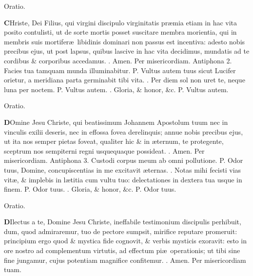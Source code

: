 \documentclass[letter,11pt]{book}
\makeatletter
\DeclareRobustCommand{\Vbar}{\vers@resp{-0.1em}{V}}
\DeclareRobustCommand{\Rbar}{\vers@resp{0pt}{R}}
\newcommand{\vers@resp@sym}{\raisebox{0.2ex}{\rotatebox[origin=c]{-20}{$\m@th\rceil$}}}
\newcommand{\vers@resp}[2]{%
  {\ooalign{\hidewidth\kern#1\vers@resp@sym\hidewidth\cr#2\cr}}%
}%
\def\P{\color{Red} P. \color{black}}
\def\V{\color{Red} \Vbar . \color{black}}
\def\R{\color{Red} \Rbar . \color{black}}
\makeatother
\begin{document}
\begin{multicols*}{2}
\vspace{-.5em} \begin{center} \color{Red} Oratio. \color{black} \end{center} \vspace{-.5em}
\lettrine[lines=2]{\bfseries \color{Red} C}{}Hriste, Dei Filius, qui virgini discipulo virginitatis pr\ae mia etiam in hac vita posito contulisti, ut de sorte mortis posset suscitare membra morientia, qui in membris suis mortifer\ae \ libidinis dominari non passus est incentiva: adesto nobis precibus ejus, ut post lapsus, quibus lascive in hac vita decidimus, mundatis ad te cordibus \& corporibus accedamus. \R Amen. Per misericordiam.
\newline \color{Red} Antiphona 2. \color{black} Facies tua tamquam munda illuminabitur. \P Vultus autem tuus sicut Lucifer orietur, a meridiana parta germinabit tibi vita. \V Per diem sol non uret te, neque luna per noctem. \P Vultus autem. \V Gloria, \& honor, \&c. \P Vultus autem.
\vspace{-.5em} \begin{center} \color{Red} Oratio. \color{black} \end{center} \vspace{-.5em}
\lettrine[lines=2]{\bfseries \color{Red} D}{}Omine Jesu Christe, qui beatissimum Johannem Apostolum tuum nec in vinculis exilii deseris, nec in effossa fovea derelinquis; annue nobis precibus ejus, ut ita nos semper pietas foveat, qualiter hic \& in \ae ternum, te protegente, sceptrum nos sempiterni regni usquequaque possideat. \R Amen. Per misericordiam.
\newline \color{Red} Antiphona 3. \color{black} Custodi corpus meum ab omni pollutione. \P Odor tuus, Domine, concupiscentias in me excitavit \ae ternas. \V Notas mihi fecisti vias vit\ae , \& implebis in l\ae titia cum vultu tuo: delectationes in dextera tua usque in finem. \P Odor tuus. \V Gloria, \& honor, \&c. \P Odor tuus.
\vspace{-.5em} \begin{center} \color{Red} Oratio. \color{black} \end{center} \vspace{-.5em}
\lettrine[lines=2]{\bfseries \color{Red} D}{}Ilectus a te, Domine Jesu Christe, ineffabile testimonium discipulis perhibuit, dum, quod admiraremur, tuo de pectore sumpsit, mirifice reputare promeruit: principium ergo quod \& mystica fide cognovit, \& verbis mysticis exoravit: esto in ore nostro ad complementum virtutis, ad effectum pi\ae \ operationis; ut tibi sine fine jungamur, cujus potentiam magnifice confitemur. \R Amen. Per misericordiam tuam.

\end{multicols*}
\end{document}
